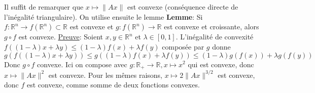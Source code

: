 \documentclass{report}
\begin{document}
\subsection{} \noindent{}\\ 
\\ 
\\
\noindent Il suffit de remarquer que $x\mapsto \|Ax\|$ est convexe (conséquence directe de l'inégalité triangulaire). On utilise ensuite le lemme\newline
\textbf{Lemme}: Si $f:\mathbb R^n\to f(\mathbb R^n)\subset \mathbb R$ est convexe et $g:f(\mathbb R^n)\to \mathbb R$ est convexe et croissante, alors $g\circ f$ est convexe.\newline 
\underline{Preuve}: Soient $x,y\in \mathbb R^n$ et $\lambda \in [0,1]$. L'inégalité de convexité $f((1-\lambda)x+\lambda y)\leq (1-\lambda)f(x) + \lambda f(y)$ composée par $g$ donne $$g(f((1-\lambda)x+\lambda y)) \leq g((1-\lambda)f(x) + \lambda f(y))\leq (1-\lambda)g(f(x)) + \lambda g(f(y))$$
Donc $g\circ f$ convexe. \newline \newline
Ici on compose avec $g:\mathbb R_+\to \mathbb R, x\mapsto x^2 $ qui est convexe, donc $x\mapsto \|Ax\|^2$ est convexe.\newline
Pour les mêmes raisons, $x\mapsto 2\|Ax\|^{3/2}$ est convexe, donc $f$ est convexe, comme somme de deux fonctions convexes.

\subsection{} \noindent\fbox{
\parbox{\linewidth}{

}}\\ 
\\ 
\\
\noindent
\end{document}
